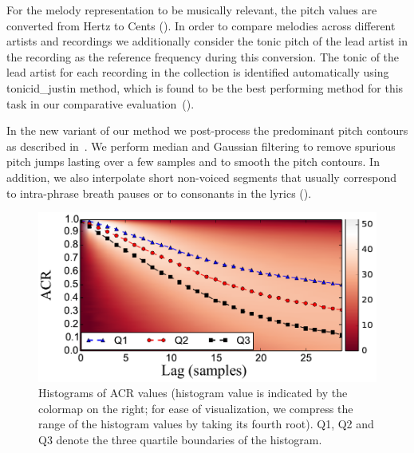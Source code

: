 For the melody representation to be musically relevant, the pitch values are converted from Hertz to Cents (). In order to compare melodies across different artists and recordings we additionally consider the tonic pitch of the lead artist in the recording as the reference frequency during this conversion. The tonic of the lead artist for each recording in the collection is identified automatically using \acrshort{tonicid_justin} method, which is found to be the best performing method for this task in our comparative evaluation~().

In the new variant of our method we post-process the predominant pitch contours as described in~. We perform median and Gaussian filtering to remove spurious pitch jumps lasting over a few samples and to smooth the pitch contours. In addition, we also interpolate short non-voiced segments that usually correspond to intra-phrase breath pauses or to consonants in the lyrics (). 


\begin{figure}
	\begin{center}
		\includegraphics[width=\figSizeEightyFive]{ch06_patterns/figures/discovery/ACRHistogram.pdf}
	\end{center}
	\caption[Histogram of autocorrelation of the pitch subsequences for different lags]{Histograms of ACR values (histogram value is indicated by the colormap on the right; for ease of visualization, we compress the range of the histogram values by taking its fourth root). Q1, Q2 and Q3 denote the three quartile boundaries of the histogram. }
	\label{fig:ACRHistogram}
\end{figure}


